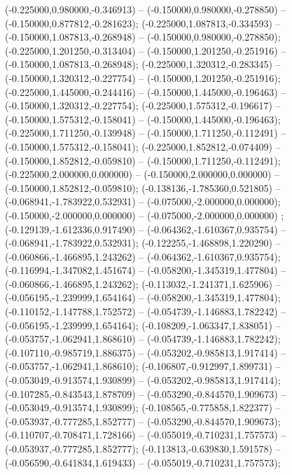  (-0.225000,0.980000,-0.346913) -- (-0.150000,0.980000,-0.278850) -- (-0.150000,0.877812,-0.281623);
 (-0.225000,1.087813,-0.334593) -- (-0.150000,1.087813,-0.268948) -- (-0.150000,0.980000,-0.278850);
 (-0.225000,1.201250,-0.313404) -- (-0.150000,1.201250,-0.251916) -- (-0.150000,1.087813,-0.268948);
 (-0.225000,1.320312,-0.283345) -- (-0.150000,1.320312,-0.227754) -- (-0.150000,1.201250,-0.251916);
 (-0.225000,1.445000,-0.244416) -- (-0.150000,1.445000,-0.196463) -- (-0.150000,1.320312,-0.227754);
 (-0.225000,1.575312,-0.196617) -- (-0.150000,1.575312,-0.158041) -- (-0.150000,1.445000,-0.196463);
 (-0.225000,1.711250,-0.139948) -- (-0.150000,1.711250,-0.112491) -- (-0.150000,1.575312,-0.158041);
 (-0.225000,1.852812,-0.074409) -- (-0.150000,1.852812,-0.059810) -- (-0.150000,1.711250,-0.112491);
 (-0.225000,2.000000,0.000000) -- (-0.150000,2.000000,0.000000) -- (-0.150000,1.852812,-0.059810);
 (-0.138136,-1.785360,0.521805) -- (-0.068941,-1.783922,0.532931) -- (-0.075000,-2.000000,0.000000);
 (-0.150000,-2.000000,0.000000) -- (-0.075000,-2.000000,0.000000) ;
 (-0.129139,-1.612336,0.917490) -- (-0.064362,-1.610367,0.935754) -- (-0.068941,-1.783922,0.532931);
 (-0.122255,-1.468898,1.220290) -- (-0.060866,-1.466895,1.243262) -- (-0.064362,-1.610367,0.935754);
 (-0.116994,-1.347082,1.451674) -- (-0.058200,-1.345319,1.477804) -- (-0.060866,-1.466895,1.243262);
 (-0.113032,-1.241371,1.625906) -- (-0.056195,-1.239999,1.654164) -- (-0.058200,-1.345319,1.477804);
 (-0.110152,-1.147788,1.752572) -- (-0.054739,-1.146883,1.782242) -- (-0.056195,-1.239999,1.654164);
 (-0.108209,-1.063347,1.838051) -- (-0.053757,-1.062941,1.868610) -- (-0.054739,-1.146883,1.782242);
 (-0.107110,-0.985719,1.886375) -- (-0.053202,-0.985813,1.917414) -- (-0.053757,-1.062941,1.868610);
 (-0.106807,-0.912997,1.899731) -- (-0.053049,-0.913574,1.930899) -- (-0.053202,-0.985813,1.917414);
 (-0.107285,-0.843543,1.878709) -- (-0.053290,-0.844570,1.909673) -- (-0.053049,-0.913574,1.930899);
 (-0.108565,-0.775858,1.822377) -- (-0.053937,-0.777285,1.852777) -- (-0.053290,-0.844570,1.909673);
 (-0.110707,-0.708471,1.728166) -- (-0.055019,-0.710231,1.757573) -- (-0.053937,-0.777285,1.852777);
 (-0.113813,-0.639830,1.591578) -- (-0.056590,-0.641834,1.619433) -- (-0.055019,-0.710231,1.757573);
